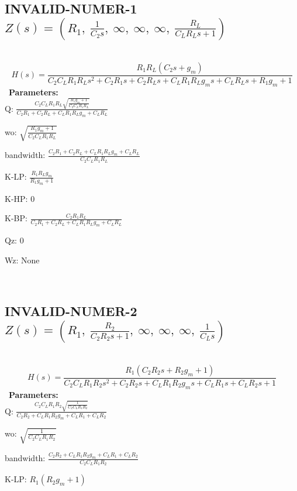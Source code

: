 \documentclass{article}
\begin{document}
\subsection{INVALID-NUMER-1 $Z(s) = \left( R_{1}, \  \frac{1}{C_{2} s}, \  \infty, \  \infty, \  \infty, \  \frac{R_{L}}{C_{L} R_{L} s + 1}\right)$ } \ 
\textbf{\[H(s) = \frac{R_{1} R_{L} \left(C_{2} s + g_{m}\right)}{C_{2} C_{L} R_{1} R_{L} s^{2} + C_{2} R_{1} s + C_{2} R_{L} s + C_{L} R_{1} R_{L} g_{m} s + C_{L} R_{L} s + R_{1} g_{m} + 1}\] } \ 
\textbf{Parameters:}\\ 

Q: $\frac{C_{2} C_{L} R_{1} R_{L} \sqrt{\frac{R_{1} g_{m} + 1}{C_{2} C_{L} R_{1} R_{L}}}}{C_{2} R_{1} + C_{2} R_{L} + C_{L} R_{1} R_{L} g_{m} + C_{L} R_{L}}$\ 

wo: $\sqrt{\frac{R_{1} g_{m} + 1}{C_{2} C_{L} R_{1} R_{L}}}$\ 

bandwidth: $\frac{C_{2} R_{1} + C_{2} R_{L} + C_{L} R_{1} R_{L} g_{m} + C_{L} R_{L}}{C_{2} C_{L} R_{1} R_{L}}$\ 

K-LP: $\frac{R_{1} R_{L} g_{m}}{R_{1} g_{m} + 1}$\ 

K-HP: $0$\ 

K-BP: $\frac{C_{2} R_{1} R_{L}}{C_{2} R_{1} + C_{2} R_{L} + C_{L} R_{1} R_{L} g_{m} + C_{L} R_{L}}$\ 

Qz: $0$\ 

Wz: $\text{None}$\ 

\ 

\subsection{INVALID-NUMER-2 $Z(s) = \left( R_{1}, \  \frac{R_{2}}{C_{2} R_{2} s + 1}, \  \infty, \  \infty, \  \infty, \  \frac{1}{C_{L} s}\right)$ } \ 
\textbf{\[H(s) = \frac{R_{1} \left(C_{2} R_{2} s + R_{2} g_{m} + 1\right)}{C_{2} C_{L} R_{1} R_{2} s^{2} + C_{2} R_{2} s + C_{L} R_{1} R_{2} g_{m} s + C_{L} R_{1} s + C_{L} R_{2} s + 1}\] } \ 
\textbf{Parameters:}\\ 

Q: $\frac{C_{2} C_{L} R_{1} R_{2} \sqrt{\frac{1}{C_{2} C_{L} R_{1} R_{2}}}}{C_{2} R_{2} + C_{L} R_{1} R_{2} g_{m} + C_{L} R_{1} + C_{L} R_{2}}$\ 

wo: $\sqrt{\frac{1}{C_{2} C_{L} R_{1} R_{2}}}$\ 

bandwidth: $\frac{C_{2} R_{2} + C_{L} R_{1} R_{2} g_{m} + C_{L} R_{1} + C_{L} R_{2}}{C_{2} C_{L} R_{1} R_{2}}$\ 

K-LP: $R_{1} \left(R_{2} g_{m} + 1\right)$\ 
\end{document}
